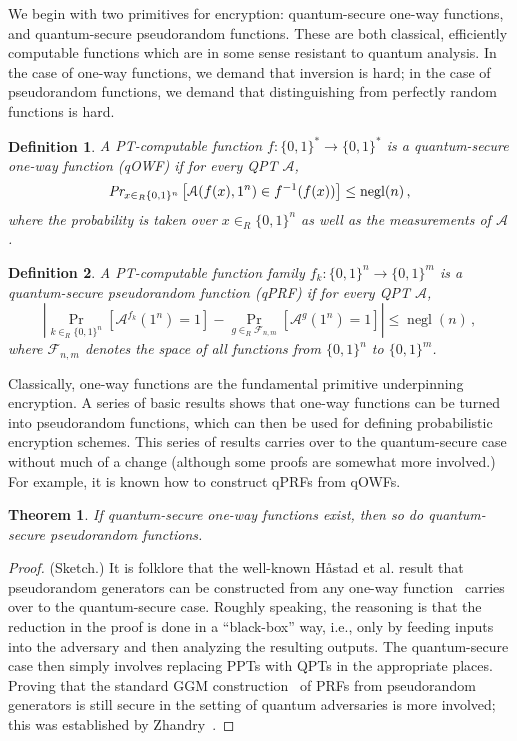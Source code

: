 \documentclass[11pt]{article}
\numberwithin{equation}{section}
\newtheorem{theorem}{Theorem}
\newtheorem{definition}{Definition}
\newcommand{\opn}{\operatorname}
\newcommand{\algo}{\mathcal}
\newcommand{\negl}{\opn{negl}}
\newcommand{\inrand}{\in_R}
\newcommand{\prob}{\opn{Pr}}
\begin{document}
{We begin with two primitives for encryption: quantum-secure one-way functions, and quantum-secure pseudorandom functions. These are both classical, efficiently computable functions which are in some sense resistant to quantum analysis. In the case of one-way functions, we demand that inversion is hard; in the case of pseudorandom functions, we demand that distinguishing from perfectly random functions is hard.

\begin{definition}\label{def:quantum-secure-owf}
A PT-computable function $f:\{0,1\}^* \rightarrow \{0, 1\}^*$ is a quantum-secure one-way function (qOWF) if for every QPT $\algo A$, 
$$
\emph{Pr}_{x \inrand \{0, 1\}^n} \left[\algo A (f(x), 1^n) \in f^{-1}(f(x)) \right] \leq \negl(n)\,,
$$
where the probability is taken over $x \inrand \{0, 1\}^n$ as well as the measurements of $\algo A$.
\end{definition}

\begin{definition}\label{def:quantum-secure-prf}
A PT-computable function family $f_k : \{0,1\}^n \rightarrow \{0, 1\}^m$ is a quantum-secure pseudorandom function (qPRF) if for every QPT $\algo A$, 
$$
\left|\prob_{k \inrand \{0, 1\}^n} [\algo A^{f_k}(1^n) = 1] - \prob_{g \inrand \mathcal F_{n, m}}[ \algo A^g(1^n) = 1]\right|
\leq \negl(n)\,,
$$
where $\mathcal F_{n, m}$ denotes the space of all functions from $\{0,1\}^n$ to $\{0,1\}^m$.
\end{definition}

Classically, one-way functions are the fundamental primitive underpinning encryption. A series of basic results shows that one-way functions can be turned into pseudorandom functions, which can then be used for defining probabilistic encryption schemes. This series of results carries over to the quantum-secure case without much of a change (although some proofs are somewhat more involved.) For example, it is known how to construct qPRFs from qOWFs.

\begin{theorem}\label{thm:qOWF-implies-qPRF}
If quantum-secure one-way functions exist, then so do quantum-secure pseudorandom functions.
\end{theorem}
\begin{proof} (Sketch.) It is folklore that the well-known H{\aa}stad et al. result that pseudorandom generators can be constructed from any one-way function~\cite{HILL99} carries over to the quantum-secure case. Roughly speaking, the reasoning is that the reduction in the proof is done in a ``black-box'' way, i.e., only by feeding inputs into the adversary and then analyzing the resulting outputs. The quantum-secure case then simply involves replacing PPTs with QPTs in the appropriate places. Proving that the standard GGM construction~\cite{GGM86} of PRFs from pseudorandom generators is still secure in the setting of quantum adversaries is more involved; this was established by Zhandry~\cite{Zhandry2012}.
\end{proof}

}
\end{document}
